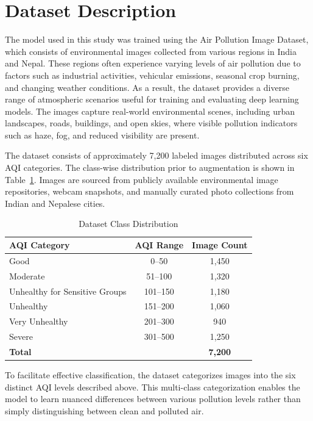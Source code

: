 \documentclass[conference]{IEEEtran}
\begin{document}
\section{Dataset Description}

The model used in this study was trained using the Air Pollution Image
Dataset, which consists of environmental images collected from various regions
in India and Nepal. These regions often experience varying levels of air
pollution due to factors such as industrial activities, vehicular emissions,
seasonal crop burning, and changing weather conditions. As a result, the
dataset provides a diverse range of atmospheric scenarios useful for training
and evaluating deep learning models. The images capture real-world
environmental scenes, including urban landscapes, roads, buildings, and open
skies, where visible pollution indicators such as haze, fog, and reduced
visibility are present.

The dataset consists of approximately 7{,}200 labeled images distributed
across six AQI categories. The class-wise distribution prior to augmentation
is shown in Table~\ref{tab:dataset}. Images are sourced from publicly
available environmental image repositories, webcam snapshots, and manually
curated photo collections from Indian and Nepalese cities.

\begin{table}[h]
  \centering
  \caption{Dataset Class Distribution}
  \label{tab:dataset}
  \renewcommand{\arraystretch}{1.3}
  \begin{tabular}{lcc}
    \toprule
    \textbf{AQI Category} & \textbf{AQI Range} & \textbf{Image Count} \\
    \midrule
    Good                       & 0--50   & 1{,}450 \\
    Moderate                   & 51--100 & 1{,}320 \\
    Unhealthy for Sensitive Groups & 101--150 & 1{,}180 \\
    Unhealthy                  & 151--200 & 1{,}060 \\
    Very Unhealthy             & 201--300 & 940  \\
    Severe                     & 301--500 & 1{,}250 \\
    \midrule
    \textbf{Total}             &         & \textbf{7{,}200} \\
    \bottomrule
  \end{tabular}
\end{table}

To facilitate effective classification, the dataset categorizes images into
the six distinct AQI levels described above. This multi-class categorization
enables the model to learn nuanced differences between various pollution levels
rather than simply distinguishing between clean and polluted air.
\end{document}

